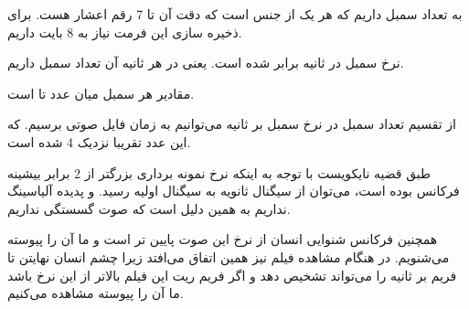 {به تعداد  سمبل داریم که هر یک از جنس 
 است که دقت آن تا 7 رقم اعشار هست. برای ذخیره سازی این فرمت نیاز به 8 بایت داریم.

نرخ سمبل در ثانیه برابر  شده است. یعنی در هر ثانیه آن تعداد سمبل داریم.

مقادیر هر سمبل میان عدد  تا  است.

از تقسیم تعداد سمبل در نرخ سمبل بر ثانیه می‌توانیم به زمان فایل صوتی برسیم. که این عدد تقریبا نزدیک 4 شده است.

طبق قضیه نایکویست با توجه به اینکه نرخ نمونه برداری بزرگتر از 2 برابر بیشینه فرکانس بوده است، می‌توان از سیگنال ثانویه به سیگنال اولیه رسید. و پدیده آلیاسینگ نداریم به همین دلیل است که صوت گسستگی نداریم.

همچنین فرکانس شنوایی انسان از نرخ این صوت پایین تر است و ما آن را پیوسته می‌شنویم. در هنگام مشاهده فیلم نیز همین اتفاق می‌افتد زیرا چشم انسان نهایتن تا  فریم بر ثانیه را می‌تواند تشخیص دهد و اگر فریم ریت این فیلم بالاتر از این نرخ باشد ما آن را پیوسته مشاهده می‌کنیم.
}